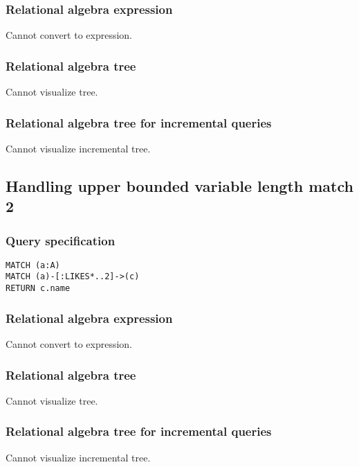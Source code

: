 \subsubsection*{Relational algebra expression}

Cannot convert to expression.

\subsubsection*{Relational algebra tree}

Cannot visualize tree.

\subsubsection*{Relational algebra tree for incremental queries}

Cannot visualize incremental tree.

\subsection{Handling upper bounded variable length match 2}

\subsubsection*{Query specification}

\begin{lstlisting}
MATCH (a:A)
MATCH (a)-[:LIKES*..2]->(c)
RETURN c.name
\end{lstlisting}

\subsubsection*{Relational algebra expression}

Cannot convert to expression.

\subsubsection*{Relational algebra tree}

Cannot visualize tree.

\subsubsection*{Relational algebra tree for incremental queries}

Cannot visualize incremental tree.

